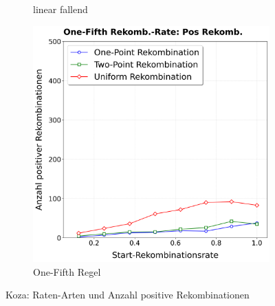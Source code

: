 \begin{figure}[H]
\begin{subfigure}[b]{0.32\textwidth}
		\caption{linear fallend}
		\label{fig:kozaPosRekombinationClegg}
	\end{subfigure}%
	\hfill
	\begin{subfigure}[b]{0.32\textwidth}
		\includegraphics[width=\textwidth]{Bilder/KozaPlotPositiveRekombinationOneFifth.png}
		\caption{One-Fifth Regel}
		\label{fig:kozaPosRekombinationOneFifth}
	\end{subfigure}
	\caption{Koza: Raten-Arten und Anzahl positive Rekombinationen}
	\label{fig:kozaPosRekombination}
\end{figure}

